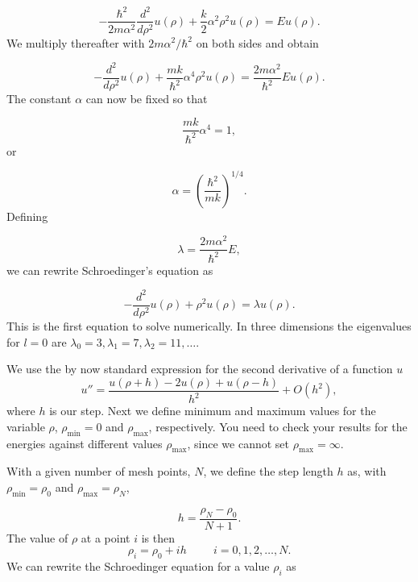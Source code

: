 \documentclass[%
oneside,                 %
final,                   %
10pt]{article}
\begin{document}
\begin{equation*}
  -\frac{\hbar^2}{2 m \alpha^2} \frac{d^2}{d\rho^2} u(\rho) 
       + \frac{k}{2} \alpha^2\rho^2u(\rho)  = E u(\rho) .
\end{equation*}
We multiply thereafter with $2m\alpha^2/\hbar^2$ on both sides and obtain

\begin{equation*}
  -\frac{d^2}{d\rho^2} u(\rho) 
       + \frac{mk}{\hbar^2} \alpha^4\rho^2u(\rho)  = \frac{2m\alpha^2}{\hbar^2}E u(\rho) .
\end{equation*}
The constant $\alpha$ can now be fixed
so that

\begin{equation*}
\frac{mk}{\hbar^2} \alpha^4 = 1,
\end{equation*}
or

\begin{equation*}
\alpha = \left(\frac{\hbar^2}{mk}\right)^{1/4}.
\end{equation*}
Defining

\begin{equation*}
\lambda = \frac{2m\alpha^2}{\hbar^2}E,
\end{equation*}
we can rewrite Schroedinger's equation as

\begin{equation*}
  -\frac{d^2}{d\rho^2} u(\rho) + \rho^2u(\rho)  = \lambda u(\rho) .
\end{equation*}
This is the first equation to solve numerically. In three dimensions 
the eigenvalues for $l=0$ are 
$\lambda_0=3,\lambda_1=7,\lambda_2=11,\dots .$

We use the by now standard
expression for the second derivative of a function $u$
\begin{equation}
    u''=\frac{u(\rho+h) -2u(\rho) +u(\rho-h)}{h^2} +O(h^2),
    \label{eq:diffoperation}
\end{equation}
where $h$ is our step.
Next we define minimum and maximum values for the variable $\rho$,
$\rho_{\mathrm{min}}=0$  and $\rho_{\mathrm{max}}$, respectively.
You need to check your results for the energies against different values
$\rho_{\mathrm{max}}$, since we cannot set
$\rho_{\mathrm{max}}=\infty$. 

With a given number of mesh points, $N$, we 
define the step length $h$ as, with $\rho_{\mathrm{min}}=\rho_0$  and $\rho_{\mathrm{max}}=\rho_N$,

\begin{equation*}
  h=\frac{\rho_N-\rho_0 }{N+1}.
\end{equation*}
The value of $\rho$ at a point $i$ is then 
\[
    \rho_i= \rho_0 + ih \hspace{1cm} i=0,1,2,\dots , N.
\]
We can rewrite the Schroedinger equation for a value $\rho_i$ as
\end{document}
